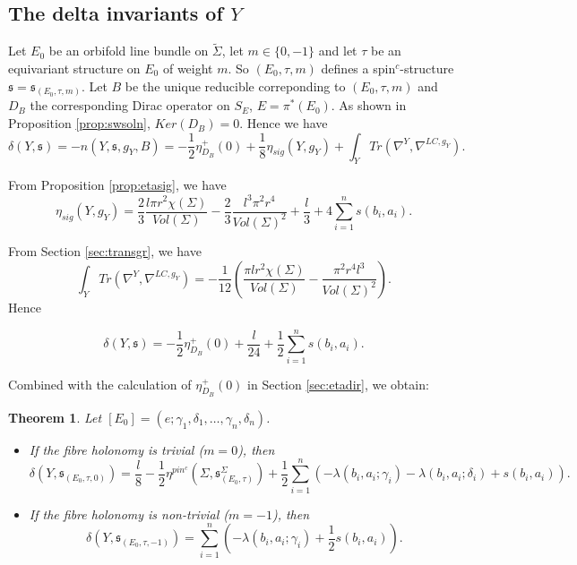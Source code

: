 \documentclass{amsart}
\newtheorem{theorem}{Theorem}[section]
\theoremstyle{definition}
\theoremstyle{remark}
\numberwithin{equation}{section}
\begin{document}
\subsection{The delta invariants of $Y$}\label{sec:dY2}

Let $E_0$ be an orbifold line bundle on $\widetilde{\Sigma}$, let $m \in \{0,-1\}$ and let $\tau$ be an equivariant structure on $E_0$ of weight $m$. So $(E_0 , \tau , m)$ defines a spin$^c$-structure $\mathfrak{s} = \mathfrak{s}_{(E_0 , \tau , m)}$. Let $B$ be the unique reducible correponding to $(E_0 , \tau , m)$ and $D_B$ the corresponding Dirac operator on $S_E$, $E = \pi^*(E_0)$. As shown in Proposition \ref{prop:swsoln}, $Ker(D_B) = 0$. Hence we have
\[
\delta(Y,\mathfrak{s}) = -n(Y,\mathfrak{s} , g_Y , B ) = -\frac{1}{2} \eta_{D_B}^+(0) + \frac{1}{8}\eta_{sig}(Y , g_Y) + \int_Y Tr( \nabla^Y , \nabla^{LC,g_Y}).
\]

From Proposition \ref{prop:etasig}, we have
\[
\eta_{sig}(Y , g_Y ) = \frac{2}{3} \frac{ l \pi r^2 \chi(\Sigma) }{Vol(\Sigma)} - \frac{2}{3} \frac{ l^3 \pi^2 r^4}{Vol(\Sigma)^2} + \frac{l}{3} + 4 \sum_{i=1}^{n} s(b_i,a_i).
\]

From Section \ref{sec:transgr}, we have
\[
\int_Y Tr(\nabla^Y , \nabla^{LC,g_Y}) = -\frac{1}{12} \left( \frac{ \pi l r^2 \chi(\Sigma)}{Vol(\Sigma)} - \frac{ \pi^2 r^4 l^3}{Vol(\Sigma)^2} \right).
\]
Hence

\[
\delta(Y, \mathfrak{s}) = -\frac{1}{2}\eta_{D_B}^+(0) + \frac{l}{24} + \frac{1}{2} \sum_{i=1}^n s(b_i,a_i).
\]

Combined with the calculation of $\eta_{D_B}^+(0)$ in Section \ref{sec:etadir}, we obtain:

\begin{theorem}\label{thm:deltaY}
Let $[E_0] = (e ; \gamma_1 , \delta_1 , \dots , \gamma_n , \delta_n)$.
\begin{itemize}
\item[(1)]{If the fibre holonomy is trivial ($m=0$), then
\[
\delta(Y,\mathfrak{s}_{(E_0 , \tau , 0)}) =  \frac{l}{8} - \frac{1}{2} \eta^{pin^c}(\Sigma , \mathfrak{s}_{(E_0 , \tau)}^{\Sigma}) +\frac{1}{2} \sum_{i=1}^n \left( -\lambda(b_i,a_i ; \gamma_i) - \lambda(b_i,a_i ; \delta_i)  + s(b_i,a_i) \right).
\]
}
\item[(2)]{If the fibre holonomy is non-trivial ($m=-1$), then
\[
\delta(Y , \mathfrak{s}_{(E_0 , \tau , -1)}) =  \sum_{i=1}^n \left( -\lambda(b_i , a_i ; \gamma_i) + \frac{1}{2}s(b_i,a_i) \right).
\]
}
\end{itemize}

\end{theorem}
\end{document}
